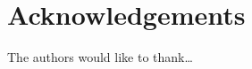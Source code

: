 \documentclass{article}
\begin{document}
\theendnotes{}

\section*{Acknowledgements}

The authors would like to thank\dots




%
%
%
%
\end{document}
